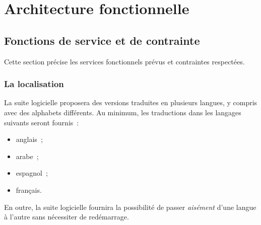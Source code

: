 \chapter{Architecture fonctionnelle}

% 

\section{Fonctions de service et de contrainte}
Cette section précise les services fonctionnels prévus et contraintes respectées.

\subsection{La localisation}
La suite logicielle proposera des versions traduites en plusieurs langues, y compris avec des alphabets différents. Au minimum, les traductions dans les langages suivants seront fournis~:
\begin{itemize}
	\item anglais~;
	\item arabe~;
	\item espagnol~;
	\item français.
\end{itemize}
En outre, la suite logicielle fournira la possibilité de passer \emph{aisément} d'une langue à l'autre sans nécessiter de redémarrage.

